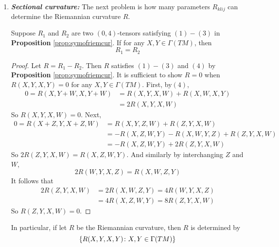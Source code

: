 \begin{enumerate}[label=\arabic{*}.]
	\item \emph{\textbf{Sectional curvature:}} The next problem is how many parameters $R_{klij}$ can determine the Riemannian curvature $R$.
	\begin{prop}
		Suppose $R_1$ and $R_2$ are two $(0,4)$-tensors satisfying $(1)-(3)$ in \textbf{Proposition} \ref{prop:symofriemcur}. If for any $X,Y \in \Gamma(TM)$, then
		\begin{equation*}
			R_1 = R_2
		\end{equation*}
	\end{prop}
	\begin{proof}
		Let $R = R_1-R_2$. Then $R$ satisfies $(1)-(3)$ and $(4)$ by \textbf{Proposition} \ref{prop:symofriemcur}. It is sufficient to show $R = 0$ when $R(X,Y,X,Y)=0$ for any $X,Y \in \Gamma(TM)$. First, by$(4)$,
		\begin{equation*}
			\begin{aligned}
				0 = R(X,Y+W,X,Y+W) &= R(X,Y,X,W) + R(X,W,X,Y) \\
				&= 2R(X,Y,X,W)
			\end{aligned}
		\end{equation*}
		So $R(X,Y,X,W) = 0$. Next,
		\begin{equation*}
			\begin{aligned}
				0=R(X+Z,Y,X+Z,W) &= R(X,Y,Z,W)+R(Z,Y,X,W) \\
				&= -R(X,Z,W,Y)-R(X,W,Y,Z)+R(Z,Y,X,W) \\
				&= -R(X,Z,W,Y)+2R(Z,Y,X,W)
			\end{aligned}
		\end{equation*}
		So $2R(Z,Y,X,W) = R(X,Z,W,Y)$. And similarly by interchanging $Z$ and $W$,
		\begin{equation*}
			2R(W,Y,X,Z) = R(X,W,Z,Y)
		\end{equation*}
		It follows that
		\begin{equation*}
			\begin{aligned}
				2R(Z,Y,X,W) &= 2R(X,W,Z,Y) = 4R(W,Y,X,Z) \\
				&= 4R(X,Z,W,Y) = 8R(Z,Y,X,W)
			\end{aligned}
		\end{equation*}
		So $R(Z,Y,X,W) =0$.
	\end{proof}
	\begin{rmk}
		In particular, if let $R$ be the Riemannian curvature, then $R$ is determined by
		\begin{equation*}
			\left\{R(X,Y,X,Y)\colon X,Y \in \Gamma(TM)\right\}
		\end{equation*}

\end{rmk}
\end{enumerate}
